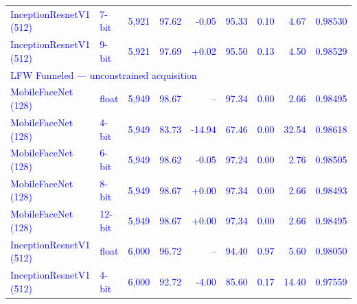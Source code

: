 \begin{tabular}{@{}llrrrrrrr@{}}
\textcolor{blue}{InceptionResnetV1 (512)} & \textcolor{blue}{7-bit} & \textcolor{blue}{5{,}921} & \textcolor{blue}{97.62} & \textcolor{blue}{-0.05} & \textcolor{blue}{95.33} & \textcolor{blue}{0.10} & \textcolor{blue}{4.67} & \textcolor{blue}{0.98530} \\
\textcolor{blue}{InceptionResnetV1 (512)} & \textcolor{blue}{9-bit} & \textcolor{blue}{5{,}921} & \textcolor{blue}{97.69} & \textcolor{blue}{+0.02} & \textcolor{blue}{95.50} & \textcolor{blue}{0.13} & \textcolor{blue}{4.50} & \textcolor{blue}{0.98529} \\
\midrule
\multicolumn{9}{l}{\textcolor{blue}{LFW Funneled --- unconstrained acquisition}} \\
\textcolor{blue}{MobileFaceNet (128)} & \textcolor{blue}{float} & \textcolor{blue}{5{,}949} & \textcolor{blue}{98.67} & \textcolor{blue}{--} & \textcolor{blue}{97.34} & \textcolor{blue}{0.00} & \textcolor{blue}{2.66} & \textcolor{blue}{0.98495} \\
\textcolor{blue}{MobileFaceNet (128)} & \textcolor{blue}{4-bit} & \textcolor{blue}{5{,}949} & \textcolor{blue}{83.73} & \textcolor{blue}{-14.94} & \textcolor{blue}{67.46} & \textcolor{blue}{0.00} & \textcolor{blue}{32.54} & \textcolor{blue}{0.98618} \\
\textcolor{blue}{MobileFaceNet (128)} & \textcolor{blue}{6-bit} & \textcolor{blue}{5{,}949} & \textcolor{blue}{98.62} & \textcolor{blue}{-0.05} & \textcolor{blue}{97.24} & \textcolor{blue}{0.00} & \textcolor{blue}{2.76} & \textcolor{blue}{0.98505} \\
\textcolor{blue}{MobileFaceNet (128)} & \textcolor{blue}{8-bit} & \textcolor{blue}{5{,}949} & \textcolor{blue}{98.67} & \textcolor{blue}{+0.00} & \textcolor{blue}{97.34} & \textcolor{blue}{0.00} & \textcolor{blue}{2.66} & \textcolor{blue}{0.98493} \\
\textcolor{blue}{MobileFaceNet (128)} & \textcolor{blue}{12-bit} & \textcolor{blue}{5{,}949} & \textcolor{blue}{98.67} & \textcolor{blue}{+0.00} & \textcolor{blue}{97.34} & \textcolor{blue}{0.00} & \textcolor{blue}{2.66} & \textcolor{blue}{0.98495} \\
\textcolor{blue}{InceptionResnetV1 (512)} & \textcolor{blue}{float} & \textcolor{blue}{6{,}000} & \textcolor{blue}{96.72} & \textcolor{blue}{--} & \textcolor{blue}{94.40} & \textcolor{blue}{0.97} & \textcolor{blue}{5.60} & \textcolor{blue}{0.98050} \\
\textcolor{blue}{InceptionResnetV1 (512)} & \textcolor{blue}{4-bit} & \textcolor{blue}{6{,}000} & \textcolor{blue}{92.72} & \textcolor{blue}{-4.00} & \textcolor{blue}{85.60} & \textcolor{blue}{0.17} & \textcolor{blue}{14.40} & \textcolor{blue}{0.97559} \\

\end{tabular}
